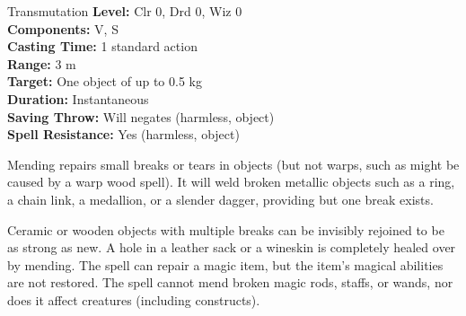 {Transmutation}
{
	\textbf{Level:}
	Clr 0, Drd 0, Wiz 0\\
	\textbf{Components:}
	V, S\\
	\textbf{Casting Time:}
	1 standard action\\
	\textbf{Range:}
	3 m\\
	\textbf{Target:}
	One object of up to 0.5 kg\\
	\textbf{Duration:}
	Instantaneous\\
	\textbf{Saving Throw:}
	Will negates (harmless, object)\\
	\textbf{Spell Resistance:}
	Yes (harmless, object)\\
}
{
	Mending repairs small breaks or tears in objects (but not warps, such as might be caused by a warp wood spell). It will weld broken metallic objects such as a ring, a chain link, a medallion, or a slender dagger, providing but one break exists.

	Ceramic or wooden objects with multiple breaks can be invisibly rejoined to be as strong as new. A hole in a leather sack or a wineskin is completely healed over by mending. The spell can repair a magic item, but the item's magical abilities are not restored. The spell cannot mend broken magic rods, staffs, or wands, nor does it affect creatures (including constructs).

}
